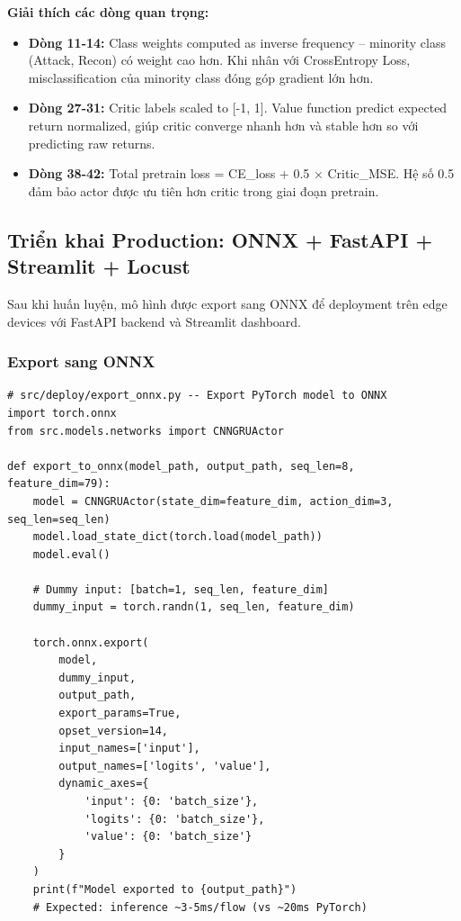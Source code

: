 \documentclass[12pt,a4paper]{article}
\begin{document}
\textbf{Giải thích các dòng quan trọng:}
\begin{itemize}
    \item \textbf{Dòng 11-14:} Class weights computed as inverse frequency -- minority class (Attack, Recon) có weight cao hơn. Khi nhân với CrossEntropy Loss, misclassification của minority class đóng góp gradient lớn hơn.
    \item \textbf{Dòng 27-31:} Critic labels scaled to [-1, 1]. Value function predict expected return normalized, giúp critic converge nhanh hơn và stable hơn so với predicting raw returns.
    \item \textbf{Dòng 38-42:} Total pretrain loss = CE\_loss + 0.5 × Critic\_MSE. Hệ số 0.5 đảm bảo actor được ưu tiên hơn critic trong giai đoạn pretrain.
\end{itemize}

\subsection{Triển khai Production: ONNX + FastAPI + Streamlit + Locust}

Sau khi huấn luyện, mô hình được export sang ONNX để deployment trên edge devices với FastAPI backend và Streamlit dashboard.

\subsubsection{Export sang ONNX}

\begin{lstlisting}[caption=ONNX Export, label=lst:onnx_export]
# src/deploy/export_onnx.py -- Export PyTorch model to ONNX
import torch.onnx
from src.models.networks import CNNGRUActor

def export_to_onnx(model_path, output_path, seq_len=8, feature_dim=79):
    model = CNNGRUActor(state_dim=feature_dim, action_dim=3, seq_len=seq_len)
    model.load_state_dict(torch.load(model_path))
    model.eval()

    # Dummy input: [batch=1, seq_len, feature_dim]
    dummy_input = torch.randn(1, seq_len, feature_dim)

    torch.onnx.export(
        model,
        dummy_input,
        output_path,
        export_params=True,
        opset_version=14,
        input_names=['input'],
        output_names=['logits', 'value'],
        dynamic_axes={
            'input': {0: 'batch_size'},
            'logits': {0: 'batch_size'},
            'value': {0: 'batch_size'}
        }
    )
    print(f"Model exported to {output_path}")
    # Expected: inference ~3-5ms/flow (vs ~20ms PyTorch)
\end{lstlisting}
\end{document}
